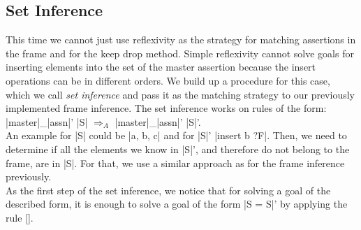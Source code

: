 \subsection{Set Inference}

This time we cannot just use reflexivity as the strategy for matching assertions in the frame and for the keep drop method. Simple reflexivity cannot solve goals for inserting elements into the set of the master assertion because the insert operations can be in different orders. We build up a procedure for this case, which we call \textit{set inference} and pass it as the matching strategy to our previously implemented frame inference. The set inference works on rules of the form: |master|\_|assn|' |S| $\Longrightarrow_A$ |master|\_|assn|' |S|'.\\
An example for |S| could be |{a, b, c}| and for |S|' |insert b ?F|. Then, we need to determine if all the elements we know in |S|', and therefore do not belong to the frame, are in |S|. For that, we use a similar approach as for the frame inference previously. \\
As the first step of the set inference, we notice that for solving a goal of the described form, it is enough to solve a goal of the form |S = S|' by applying the rule [].

